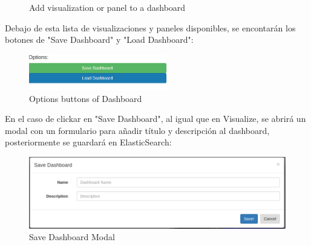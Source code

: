 \documentclass[a4paper, 12pt]{book}
\begin{document}
\begin{figure}[H]
 \centering
 \caption{Add visualization or panel to a dashboard}
 \label{f:threedcexamples}
\end{figure}

Debajo de esta lista de visualizaciones y paneles disponibles, se encontarán los botones de "Save Dashboard" y "Load Dashboard":

\begin{figure}[H]
  \centering
  \includegraphics[width=6cm, keepaspectratio]{img/development/dashbuttons}
  \caption{Options buttons of Dashboard}
  \label{fig:dashbuttons}
\end{figure}

En el caso de clickar en "Save Dashboard", al igual que en Visualize, se abrirá un modal con un formulario para añadir título y descripción al dashboard, posteriormente se guardará en ElasticSearch:

\begin{figure}[H]
  \centering
  \includegraphics[width=16cm, keepaspectratio]{img/development/examplesavedash}
  \caption{Save Dashboard Modal}
  \label{fig:examplesavedash}
\end{figure}
\end{document}
